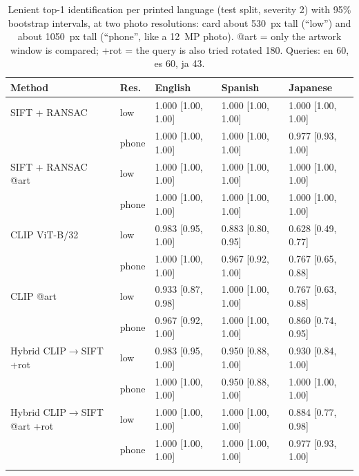 \begin{table}[htbp]\centering\footnotesize
\caption[Identification per printed language]{Lenient top-1 identification per printed language (test split, severity 2) with 95\% bootstrap intervals, at two photo resolutions: card about 530~px tall (``low'') and about 1050~px tall (``phone'', like a 12~MP photo). @art = only the artwork window is compared; +rot = the query is also tried rotated 180\textdegree. Queries: en 60, es 60, ja 43.}\label{tab:language-id}
\begin{tabular}{@{}lllll@{}}
\toprule
Method & Res. & English & Spanish & Japanese\\
\midrule
SIFT + RANSAC & low & 1.000 {\scriptsize[1.00, 1.00]} & 1.000 {\scriptsize[1.00, 1.00]} & 1.000 {\scriptsize[1.00, 1.00]}\\
 & phone & 1.000 {\scriptsize[1.00, 1.00]} & 1.000 {\scriptsize[1.00, 1.00]} & 0.977 {\scriptsize[0.93, 1.00]}\\
\addlinespace[2pt]
SIFT + RANSAC @art & low & 1.000 {\scriptsize[1.00, 1.00]} & 1.000 {\scriptsize[1.00, 1.00]} & 1.000 {\scriptsize[1.00, 1.00]}\\
 & phone & 1.000 {\scriptsize[1.00, 1.00]} & 1.000 {\scriptsize[1.00, 1.00]} & 1.000 {\scriptsize[1.00, 1.00]}\\
\addlinespace[2pt]
CLIP ViT-B/32 & low & 0.983 {\scriptsize[0.95, 1.00]} & 0.883 {\scriptsize[0.80, 0.95]} & 0.628 {\scriptsize[0.49, 0.77]}\\
 & phone & 1.000 {\scriptsize[1.00, 1.00]} & 0.967 {\scriptsize[0.92, 1.00]} & 0.767 {\scriptsize[0.65, 0.88]}\\
\addlinespace[2pt]
CLIP @art & low & 0.933 {\scriptsize[0.87, 0.98]} & 1.000 {\scriptsize[1.00, 1.00]} & 0.767 {\scriptsize[0.63, 0.88]}\\
 & phone & 0.967 {\scriptsize[0.92, 1.00]} & 1.000 {\scriptsize[1.00, 1.00]} & 0.860 {\scriptsize[0.74, 0.95]}\\
\addlinespace[2pt]
Hybrid CLIP$\to$SIFT +rot & low & 0.983 {\scriptsize[0.95, 1.00]} & 0.950 {\scriptsize[0.88, 1.00]} & 0.930 {\scriptsize[0.84, 1.00]}\\
 & phone & 1.000 {\scriptsize[1.00, 1.00]} & 0.950 {\scriptsize[0.88, 1.00]} & 1.000 {\scriptsize[1.00, 1.00]}\\
\addlinespace[2pt]
Hybrid CLIP$\to$SIFT @art +rot & low & 1.000 {\scriptsize[1.00, 1.00]} & 1.000 {\scriptsize[1.00, 1.00]} & 0.884 {\scriptsize[0.77, 0.98]}\\
 & phone & 1.000 {\scriptsize[1.00, 1.00]} & 1.000 {\scriptsize[1.00, 1.00]} & 0.977 {\scriptsize[0.93, 1.00]}\\
\addlinespace[2pt]
\bottomrule
\end{tabular}
\end{table}
